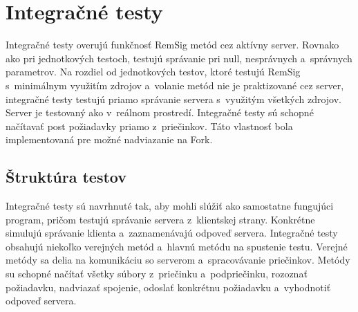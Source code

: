 \documentclass[
  printed, %
  table,   %
oneside,
  nolof,     %
  nolot,     %
]{fithesis3}
\begin{document}
\section{Integračné testy}
Integračné testy  overujú funkčnosť RemSig metód cez aktívny server. Rovnako ako pri jednotkových testoch, testujú správanie pri null, nesprávnych a~správnych parametrov. Na rozdiel od jednotkových testov, ktoré testujú RemSig s~minimálnym využitím zdrojov a~volanie metód nie je praktizované cez server, integračné testy testujú priamo správanie servera s~využitým všetkých zdrojov. Server je testovaný ako v~reálnom prostredí. Integračné testy sú schopné načítavať post požiadavky priamo z~priečinkov. Táto  vlastnosť bola implementovaná pre možné nadviazanie na  Fork.
\subsection{Štruktúra testov}  
 Integračné testy sú navrhnuté tak, aby mohli slúžiť ako samostatne fungujúci program, pričom testujú správanie servera z~klientskej strany. Konkrétne simulujú správanie klienta a~zaznamenávajú odpoveď servera. Integračné testy obsahujú niekoľko verejných metód a~hlavnú metódu na spustenie testu. Verejné metódy sa delia na komunikáciu so serverom a~spracovávanie priečinkov. Metódy su schopné načítať všetky súbory z~priečinku a~podpriečinku, rozoznať požiadavku, nadviazať spojenie, odoslať konkrétnu požiadavku a~vyhodnotiť odpoveď servera. 
\end{document}
